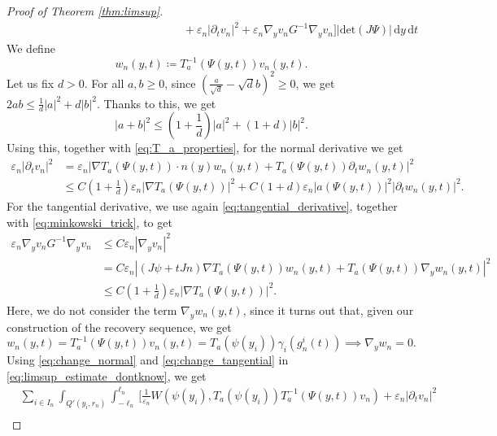 \documentclass[a4paper, 11pt, reqno]{amsart}
\theoremstyle{plain}
\theoremstyle{definition}
\theoremstyle{remark}
\newcommand{\dd}{\,\mathrm{d}}
\begin{document}
\begin{proof}[Proof of Theorem \ref{thm:limsup}]
\begin{align}
    &\hspace{6cm}+ \varepsilon_n | \partial_t v_n|^2 + \varepsilon_n \nabla_y v_n G^{-1} \nabla_y v_n \Bigr] | \mathrm{det}(J\Psi)| \dd y \dd t\label{eq:limsup_estimate_dontknow}
\end{align}
We define 
$$ w_n(y,t) \coloneqq T_a^{-1}(\Psi(y,t)) v_n(y,t). $$
Let us fix $d > 0$. For all $a,b \geq 0$, since $\left( \frac{a}{\sqrt{d}} - \sqrt{d} b \right)^2 \geq 0$, we get $2 a b \leq \frac1d |a|^2 + d |b|^2$. Thanks to this, we get
\begin{equation}\label{eq:minkowski_trick}
    | a + b |^2 \leq \left( 1 + \frac1d \right) |a|^2 + \left( 1 + d \right) |b|^2.
\end{equation}
Using this, together with \eqref{eq:T_a_properties}, for the normal derivative we get
\begin{align}
    \varepsilon_n | \partial_t v_n |^2 &= \varepsilon_n | \nabla T_a (\Psi(y,t)) \cdot n(y) w_n (y,t) + T_a(\Psi(y,t)) \partial_t w_n (y,t) |^2 \nonumber\\
    &\leq C \left( 1 + \frac1d \right) \varepsilon_n |\nabla T_a(\Psi(y,t))|^2 + C\left( 1 + d \right) \varepsilon_n |a(\Psi(y,t))|^2 |\partial_t w_n(y,t)|^2 \label{eq:change_normal}.
\end{align}
For the tangential derivative, we use again \eqref{eq:tangential_derivative}, together with \eqref{eq:minkowski_trick}, to get
\begin{align}
    \varepsilon_n \nabla_y v_n G^{-1} \nabla_y v_n &\leq C \varepsilon_n | \nabla_y v_n |^2 \nonumber\\
    &= C \varepsilon_n | (J \psi + t Jn) \nabla T_a (\Psi(y,t)) w_n (y,t) + T_a(\Psi(y,t)) \nabla_y w_n (y,t) |^2\nonumber\\
    &\leq C \left( 1 + \frac1d \right) \varepsilon_n |\nabla T_a(\Psi(y,t))|^2. \label{eq:change_tangential}
\end{align}
Here, we do not consider the term $\nabla_y w_n (y,t)$, since it turns out that, given our construction of the recovery sequence, we get
\begin{equation*}
    w_n (y,t) = T_a^{-1}(\Psi(y,t)) v_n(y,t) = T_a (\psi(y_i)) \gamma_i (g_n^i(t)) \implies \nabla_y w_n = 0.
\end{equation*}
Using \eqref{eq:change_normal} and \eqref{eq:change_tangential} in \eqref{eq:limsup_estimate_dontknow}, we get
\begin{align}
    &\sum_{i \in I_n} \int_{Q'(y_i,r_n)} \int_{-\ell_n}^{\ell_n} \bigg[ \frac{1}{\varepsilon_n} W(\psi(y_i), T_a(\psi(y_i)) T_a^{-1}(\Psi(y,t)) v_n) + \varepsilon_n | \partial_t v_n|^2 \nonumber \\

\end{align}
\end{proof}
\end{document}
